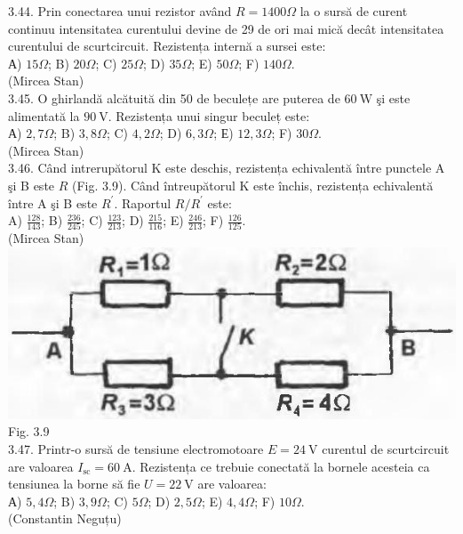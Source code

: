 \documentclass[10pt]{article}
\begin{document}
3.44. Prin conectarea unui rezistor având $R=1400 \Omega$ la o sursă de curent continuu intensitatea curentului devine de 29 de ori mai mică decât intensitatea curentului de scurtcircuit. Rezistența internă a sursei este:\\ А) $15 \Omega$; B) $20 \Omega$; C) $25 \Omega$; D) $35 \Omega$; E) $50 \Omega$; F) $140 \Omega$.\\ (Mircea Stan)\\

3.45. O ghirlandă alcătuită din 50 de beculețe are puterea de $60 \mathrm{~W}$ şi este alimentată la $90 \mathrm{~V}$. Rezistența unui singur beculeț este:\\ А) $2,7 \Omega$; B) $3,8 \Omega$; C) $4,2 \Omega$; D) $6,3 \Omega$; Е) $12,3 \Omega$; F) $30 \Omega$.\\ (Mircea Stan)\\

3.46. Când intrerupătorul K este deschis, rezistența echivalentă între punctele A şi B este $R$ (Fig. 3.9). Când întreupătorul K este închis, rezistența echivalentă între A şi B este $R^{\prime}$. Raportul $R / R^{\prime}$ este:\\ A) $\frac{128}{143}$; B) $\frac{236}{245}$; C) $\frac{123}{213}$; D) $\frac{215}{116}$; E) $\frac{246}{213}$; F) $\frac{126}{125}$.\\ (Mircea Stan)\\ \includegraphics[max width=\textwidth, center]{2025_07_01_5b3ff9fa0d508c8e9f17g-153} Fig. 3.9\\

3.47. Printr-o sursă de tensiune electromotoare $E=24 \mathrm{~V}$ curentul de scurtcircuit are valoarea $I_{\mathrm{sc}}=60 \mathrm{~A}$. Rezistența ce trebuie conectată la bornele acesteia ca tensiunea la borne să fie $U=22 \mathrm{~V}$ are valoarea:\\ А) $5,4 \Omega$; B) $3,9 \Omega$; C) $5 \Omega$; D) $2,5 \Omega$; E) $4,4 \Omega$; F) $10 \Omega$.\\ (Constantin Neguțu)\\
\end{document}

